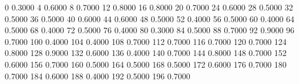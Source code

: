 0 0.3000
4 0.6000
8 0.7000
12 0.8000
16 0.8000
20 0.7000
24 0.6000
28 0.5000
32 0.5000
36 0.5000
40 0.6000
44 0.6000
48 0.5000
52 0.4000
56 0.5000
60 0.4000
64 0.5000
68 0.4000
72 0.5000
76 0.4000
80 0.3000
84 0.5000
88 0.7000
92 0.9000
96 0.7000
100 0.4000
104 0.4000
108 0.7000
112 0.7000
116 0.7000
120 0.7000
124 0.8000
128 0.9000
132 0.6000
136 0.4000
140 0.7000
144 0.8000
148 0.7000
152 0.6000
156 0.7000
160 0.5000
164 0.5000
168 0.5000
172 0.6000
176 0.7000
180 0.7000
184 0.6000
188 0.4000
192 0.5000
196 0.7000
